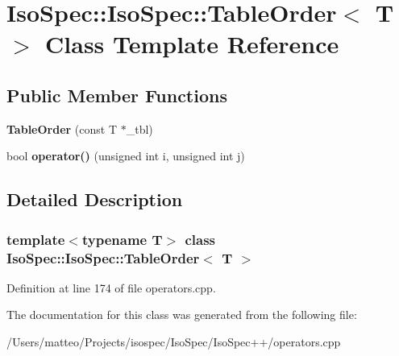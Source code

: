 \hypertarget{class_iso_spec_1_1_iso_spec_1_1_table_order}{}\section{Iso\+Spec\+:\+:Iso\+Spec\+:\+:Table\+Order$<$ T $>$ Class Template Reference}
\label{class_iso_spec_1_1_iso_spec_1_1_table_order}
\subsection*{Public Member Functions}
\begin{DoxyCompactItemize}
\item 
\mbox{\label{class_iso_spec_1_1_iso_spec_1_1_table_order_ad7f7ff01c71c3ba7308f8576dc7226c6}} 
{\bfseries Table\+Order} (const T $\ast$\+\_\+tbl)
\item 
\mbox{\label{class_iso_spec_1_1_iso_spec_1_1_table_order_a0b952830050570f97ffd71137548c431}} 
bool {\bfseries operator()} (unsigned int i, unsigned int j)
\end{DoxyCompactItemize}


\subsection{Detailed Description}
\subsubsection*{template$<$typename T$>$\newline
class Iso\+Spec\+::\+Iso\+Spec\+::\+Table\+Order$<$ T $>$}



Definition at line 174 of file operators.\+cpp.



The documentation for this class was generated from the following file\+:\begin{DoxyCompactItemize}
\item 
/\+Users/matteo/\+Projects/isospec/\+Iso\+Spec/\+Iso\+Spec++/operators.\+cpp\end{DoxyCompactItemize}
